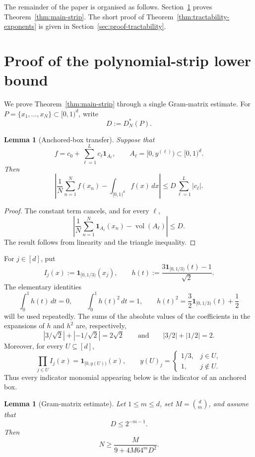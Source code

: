\documentclass[11pt]{article}
\theoremstyle{plain}
\newtheorem{lemma}[theorem]{Lemma}
\theoremstyle{remark}
\theoremstyle{definition}
\newcommand{\1}{\mathbf{1}}
\newcommand{\vol}{\operatorname{vol}}
\begin{document}
The remainder of the paper is organised as follows.  Section~\ref{sec:proof-main} proves Theorem~\ref{thm:main-strip}.  The short proof of Theorem~\ref{thm:tractability-exponents} is given in Section~\ref{sec:proof-tractability}.


\section{Proof of the polynomial-strip lower bound}\label{sec:proof-main}

We prove Theorem~\ref{thm:main-strip} through a single Gram-matrix estimate.
For \(P=\{x_1,\dots,x_N\}\subset[0,1)^d\), write
\[
 D:=D_N^\ast(P).
\]

\begin{lemma}[Anchored-box transfer]\label{lem:transfer-short}
Suppose that
\[
 f=c_0+\sum_{\ell=1}^L c_\ell\1_{A_\ell},
 \qquad A_\ell=[0,y^{(\ell)})\subset[0,1)^d.
\]
Then
\[
 \left|
 \frac1N\sum_{n=1}^N f(x_n)
 -\int_{[0,1)^d}f(x)\,dx
 \right|
 \le D\sum_{\ell=1}^L|c_\ell|.
\]
\end{lemma}

\begin{proof}
The constant term cancels, and for every \(\ell\),
\[
 \left|
 \frac1N\sum_{n=1}^N\1_{A_\ell}(x_n)-\vol(A_\ell)
 \right|\le D.
\]
The result follows from linearity and the triangle inequality.
\end{proof}

For \(j\in[d]\), put
\[
 I_j(x):=\1_{[0,1/3)}(x_j),
 \qquad
 h(t):=\frac{3\1_{[0,1/3)}(t)-1}{\sqrt2}.
\]
The elementary identities
\begin{equation}\label{eq:h-short}
 \int_0^1h(t)\,dt=0,\qquad
 \int_0^1h(t)^2\,dt=1,\qquad
 h(t)^2=\frac32\1_{[0,1/3)}(t)+\frac12
\end{equation}
will be used repeatedly.  The sums of the absolute values of the
coefficients in the expansions of \(h\) and \(h^2\) are, respectively,
\[
 | 3/\sqrt{2}| + |-1/\sqrt{2}| = 2\sqrt2
 \qquad\text{and}\qquad
 |3/2| + |1/2| = 2.
\]
Moreover, for every \(U\subseteq[d]\),
\[
 \prod_{j\in U}I_j(x)=\1_{[0,y(U))}(x),
 \qquad
 y(U)_j=
 \begin{cases}
 1/3,&j\in U,\\
 1,&j\notin U.
 \end{cases}
\]
Thus every indicator monomial appearing below is the indicator of an
anchored box.

\begin{lemma}[Gram-matrix estimate]\label{lem:gram-short}
Let \(1\le m\le d\), set \(M=\binom dm\), and assume that
\[
 D\le2^{-m-1}.
\]
Then
\begin{equation*}
 N\ge\frac{M}{9+4M64^mD^2}.
\end{equation*}
\end{lemma}
\end{document}
